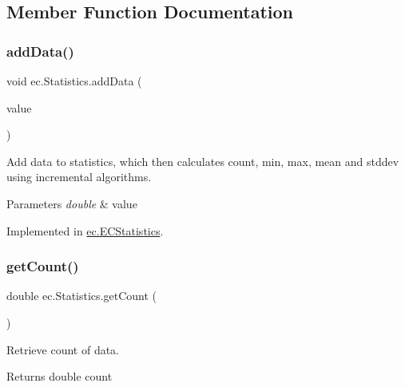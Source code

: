 \subsection{Member Function Documentation}
\mbox{\label{interfaceec_1_1_statistics_a8c59a234d776281dd7bd9fb05d0cb12e}} 
\subsubsection{\texorpdfstring{add\+Data()}{addData()}}
{\footnotesize\ttfamily void ec.\+Statistics.\+add\+Data (\begin{DoxyParamCaption}\item[{double}]{value }\end{DoxyParamCaption})}



Add data to statistics, which then calculates count, min, max, mean and stddev using incremental algorithms. 


\begin{DoxyParams}{Parameters}
{\em double} & value \\
\hline
\end{DoxyParams}


Implemented in \hyperlink{classec_1_1_e_c_statistics_a60feff78d1b3a0b548544d9cfbd6a051}{ec.\+E\+C\+Statistics}.

\mbox{\label{interfaceec_1_1_statistics_aa9a82f2a37f7f6563106075872bc7af2}} 
\subsubsection{\texorpdfstring{get\+Count()}{getCount()}}
{\footnotesize\ttfamily double ec.\+Statistics.\+get\+Count (\begin{DoxyParamCaption}{ }\end{DoxyParamCaption})}



Retrieve count of data. 

\begin{DoxyReturn}{Returns}
double count 
\end{DoxyReturn}


